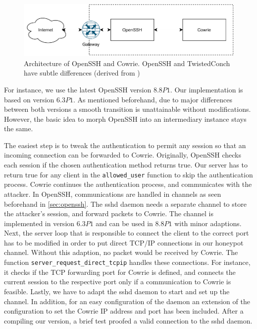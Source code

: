 \begin{figure}[ht]
    \centering
    \includegraphics{figures/sshd-honeypot.pdf}
    \caption[Architecture of OpenSSH and Cowrie]{Architecture of OpenSSH and Cowrie. OpenSSH and TwistedConch have subtle differences (derived from \cite{vetterl2020})}
    \label{fig:cowrie-fix}
\end{figure}

For instance, we use the latest OpenSSH version $8.8P1$.
Our implementation is based on \citet{vetterl2020} version $6.3P1$.
As mentioned beforehand, due to major differences between both versions a smooth transition is unattainable without modifications.
However, the basic idea to morph OpenSSH into an intermediary instance stays the same. 

The easiest step is to tweak the authentication to permit any session so that an incoming connection can be forwarded to Cowrie.
Originally, OpenSSH checks each session if the chosen authentication method returns true.
Our server has to return true for any client in the \verb|allowed_user| function to skip the authentication process.
Cowrie continues the authentication process, and communicates with the attacker.
In OpenSSH, communications are handled in channels as seen beforehand in \autoref{sec:openssh}.
The sshd daemon needs a separate channel to store the attacker's session, and forward packets to Cowrie.
The channel is implemented in version $6.3P1$ and can be used in $8.8P1$ with minor adaptions.
Next, the server loop that is responsible to connect the client to the correct port has to be modified in order to put direct TCP/IP connections in our honeypot channel.
Without this adaption, no packet would be received by Cowrie.
The function \verb|server_request_direct_tcpip| handles these connections.
For instance, it checks if the TCP forwarding port for Cowrie is defined, and connects the current session to the respective port only if a communication to Cowrie is feasible.
Lastly, we have to adapt the sshd daemon to start and set up the channel. 
In addition, for an easy configuration of the daemon an extension of the configuration to set the Cowrie IP address and port has been included. 
After a compiling our version, a brief test proofed a valid connection to the sshd daemon. 

